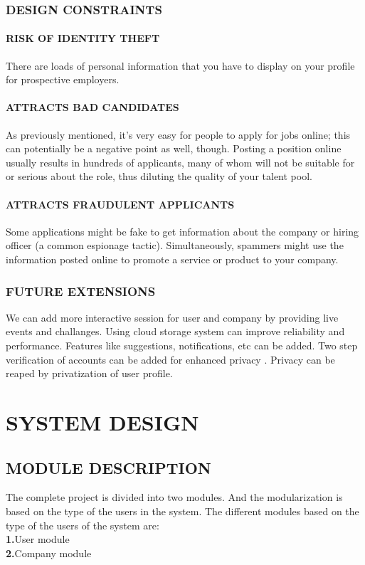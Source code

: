 \documentclass[12pt,a4paper,final]{extreport}
\begin{document}
\subsection{ DESIGN CONSTRAINTS }
\subsubsection{RISK OF IDENTITY THEFT}
\hspace{01.5cm}There are loads of personal information that you have to display on your profile for prospective employers.\\
\subsubsection{ATTRACTS BAD CANDIDATES}
\hspace{01.5cm}As previously mentioned, it’s very easy for people to apply for jobs online; this can potentially be a negative point as well, though. Posting a position online usually results in hundreds of applicants, many of whom will not be suitable for or serious about the role, thus diluting the quality of your talent pool.\\
\subsubsection{ATTRACTS FRAUDULENT APPLICANTS}
\hspace{01.5cm}Some applications might be fake to get information about the company or hiring officer (a common espionage tactic). Simultaneously, spammers might use the information posted online to promote a service or product to your company.\\
\subsection{ FUTURE EXTENSIONS }
\hspace{01.5cm}We can add more interactive session for user and company by providing live events and challanges. Using cloud storage system can improve reliability and performance. Features like suggestions, notifications, etc can be added. Two step verification of accounts can be added for enhanced privacy . Privacy can be reaped by privatization of user profile.\\
\chapter{SYSTEM DESIGN}
\section{MODULE DESCRIPTION}
\hspace{01.5cm}The complete project is divided into two modules. And the modularization is based on the type of the users in the system. The different modules based on the type of the users of the system are:\\
\textbf{1.}User module\\
\textbf{2.}Company module\\
\end{document}
